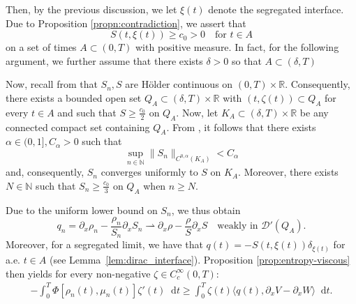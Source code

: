 \documentclass[a4paper,twosided, 11pt]{article}
\newcommand{\R}{\mathbb{R}}
\newcommand{\N}{\mathbb{N}}
\theoremstyle{plain}
\newtheorem{lemma}[thm]{Lemma}
\theoremstyle{remark}
\newcommand{\diff}{\mathop{} \mathrm{d}}
\numberwithin{equation}{section}
\begin{document}
Then, by the previous discussion, we let $\xi(t)$ denote the segregated interface. 
Due to Proposition \ref{propn:contradiction}, we assert that
$$
S(t,\xi(t))\ge c_0>0 \quad\text{for }t\in A
$$
on a set of times $A\subset(0,T)$ with positive measure.
In fact, for the following argument, we further assume that there exists $\delta > 0 $ so that $A \subset (\delta, T)$

\medskip 

Now, recall from \cite[Theorem 1.3]{Black26} that $S_n,S$ are H\"older continuous on $(0,T)\times \R$. 
Consequently, there exists a bounded open set $Q_A \subset (\delta,T)\times \R$ with $(t,\zeta(t))\subset Q_A$ for every $t \in A$ and such that $S \geq \frac{c_0}{2}$ on $Q_A$.
Now, let $K_A \subset (\delta,T)\times \R$ be any connected compact set containing $Q_A$. 
From \cite[Corollary 1.5]{Black26}, it follows that there exists $\alpha  \in (0,1], C_\alpha > 0 $ such that 
\[
\sup_{n \in \N } \|S_n\|_{C^{0,\alpha}(K_A)} < C_\alpha
\]
and, consequently, $S_n$ converges uniformly to $S$ on $K_A$. 
Moreover, there exists $N \in \N $ such that $S_n \geqslant \frac{c_0}{3}$ on $Q_A$ when $n \geqslant N$.





\medskip 
Due to the uniform lower bound on $S_n$, we thus obtain
$$
q_n= \partial_x\rho_n-\frac{\rho_n}{S_n}\partial_xS_n \rightharpoonup
\partial_x\rho-\frac{\rho}{S}\partial_xS \quad \text{weakly in } \mathcal D'(Q_A).
$$
Moreover, for a segregated limit, we have that $q(t) =-S(t,\xi(t))\delta_{\xi(t)}$ for a.e. $t\in A$ (see Lemma~\ref{lem:dirac_interface}). 
Proposition \ref{prop:entropy-viscous} then yields for every non-negative
$\zeta\in C_c^\infty(0,T)$:
\begin{align*}
-\int_0^T \Phi[\rho_n(t),\mu_n(t)]\zeta'(t)\diff t
\ge \int_0^T \zeta(t)\langle q(t), \partial_xV-\partial_xW \rangle \diff t.
\end{align*}
\end{document}
